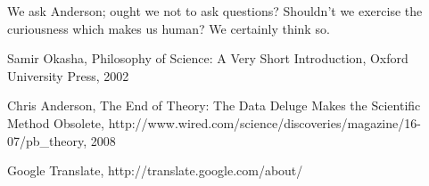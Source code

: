 \documentclass[11pt,a4paper]{article}
\begin{document}
We ask Anderson; ought we not to ask questions? Shouldn’t we exercise the curiousness which makes us human? We certainly think so.

\newpage
\begin{thebibliography}{9}
        Samir Okasha,
        Philosophy of Science: A Very Short Introduction,
        Oxford University Press,
        2002

        Chris Anderson,
        The End of Theory: The Data Deluge Makes the Scientific Method Obsolete,
        http://www.wired.com/science/discoveries/magazine/16-07/pb\_theory,
        2008

        Google Translate,
        http://translate.google.com/about/
\end{thebibliography}
\end{document}
